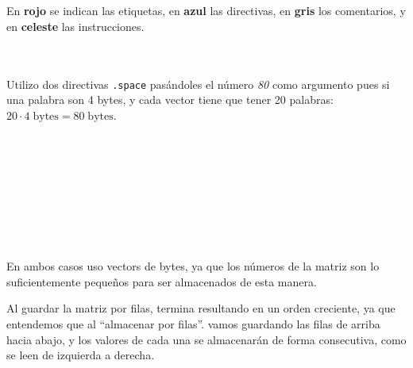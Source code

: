 \documentclass[a4paper]{report}
\begin{document}
\section{}

\inputminted{mips}{src/problemas/1.asm}

En \textcolor{autumn-red-pyg}{\textbf{rojo}} se indican las etiquetas, en \textcolor{autumn-blue-pyg}{\textbf{azul}} las directivas, en \textcolor{autumn-gray-pyg}{\textbf{gris}} los comentarios, y en \textcolor{autumn-teal-pyg}{\textbf{celeste}} las instrucciones.

\section{}

\inputminted{mips}{src/problemas/2.asm}

Utilizo dos directivas \texttt{.space} pasándoles el número \textit{80} como argumento pues si una palabra son 4 bytes, y cada vector tiene que tener 20 palabras: $20 \cdot 4\;\text{bytes} = 80\;\text{bytes}$.

\section{}

\inputminted{mips}{src/problemas/3.asm}


\section{}

\inputminted{mips}{src/problemas/4.asm}


\section{}

\inputminted[breaklines, breakbytokenanywhere]{mips}{src/problemas/5.asm}


\section{}

\inputminted{mips}{src/problemas/6.asm}

En ambos casos uso vectors de bytes, ya que los números de la matriz son lo suficientemente pequeños para ser almacenados de esta manera.

Al guardar la matriz por filas, termina resultando en un orden creciente, ya que entendemos que al ``almacenar por filas''. vamos guardando las filas de arriba hacia abajo, y los valores de cada una se almacenarán de forma consecutiva, como se leen de izquierda a derecha.
\end{document}
